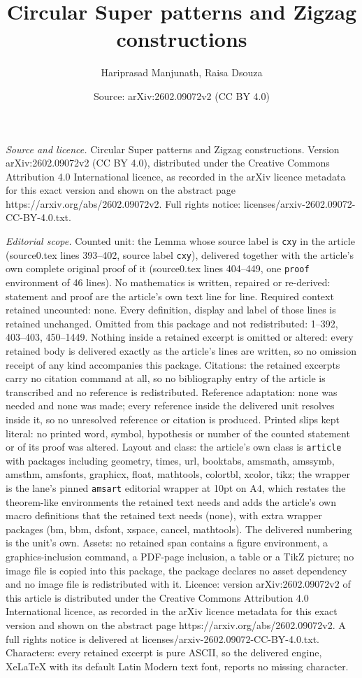 \documentclass[10pt,a4paper]{amsart}
\title[Circular Super patterns and Zigzag constructions]{Circular Super patterns and Zigzag constructions}
\author{Hariprasad Manjunath, Raisa Dsouza}
\date{Source: arXiv:2602.09072v2 (CC BY 4.0)}
\begin{document}
\maketitle

\noindent\emph{Source and licence.} Circular Super patterns and Zigzag constructions. Version arXiv:2602.09072v2 (CC BY 4.0), distributed under the Creative Commons Attribution 4.0 International licence, as recorded in the arXiv licence metadata for this exact version and shown on the abstract page https://arxiv.org/abs/2602.09072v2. Full rights notice: licenses/arxiv-2602.09072-CC-BY-4.0.txt.\par\smallskip

\noindent\textit{Editorial scope.} Counted unit: the Lemma whose source label is \texttt{cxy} in the article (source0.tex lines 393--402, source label \texttt{cxy}), delivered together with the article's own complete original proof of it (source0.tex lines 404--449, one \texttt{proof} environment of 46 lines). No mathematics is written, repaired or re-derived: statement and proof are the article's own text line for line. Required context retained uncounted: none. Every definition, display and label of those lines is retained unchanged. Omitted from this package and not redistributed: 1--392, 403--403, 450--1449. Nothing inside a retained excerpt is omitted or altered: every retained body is delivered exactly as the article's lines are written, so no omission receipt of any kind accompanies this package. Citations: the retained excerpts carry no citation command at all, so no bibliography entry of the article is transcribed and no reference is redistributed. Reference adaptation: none was needed and none was made; every reference inside the delivered unit resolves inside it, so no unresolved reference or citation is produced. Printed slips kept literal: no printed word, symbol, hypothesis or number of the counted statement or of its proof was altered. Layout and class: the article's own class is \texttt{article} with packages including geometry, times, url, booktabs, amsmath, amssymb, amsthm, amsfonts, graphicx, float, mathtools, colortbl, xcolor, tikz; the wrapper is the lane's pinned \texttt{amsart} editorial wrapper at 10pt on A4, which restates the theorem-like environments the retained text needs and adds the article's own macro definitions that the retained text needs (none), with extra wrapper packages (bm, bbm, dsfont, xspace, cancel, mathtools). The delivered numbering is the unit's own. Assets: no retained span contains a figure environment, a graphics-inclusion command, a PDF-page inclusion, a table or a TikZ picture; no image file is copied into this package, the package declares no asset dependency and no image file is redistributed with it. Licence: version arXiv:2602.09072v2 of this article is distributed under the Creative Commons Attribution 4.0 International licence, as recorded in the arXiv licence metadata for this exact version and shown on the abstract page https://arxiv.org/abs/2602.09072v2. A full rights notice is delivered at licenses/arxiv-2602.09072-CC-BY-4.0.txt. Characters: every retained excerpt is pure ASCII, so the delivered engine, XeLaTeX with its default Latin Modern text font, reports no missing character.
\end{document}
